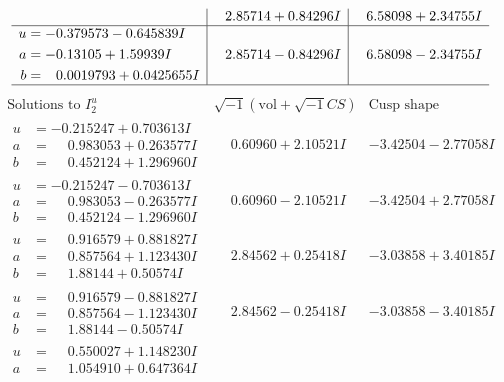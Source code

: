 \documentclass[1p]{elsarticle_modified}
\theoremstyle{definition}
\newcommand{\I}{\sqrt{-1}}
\begin{document}
$$\begin{array}{c|c|c}
 & \phantom{-}2.85714 + 0.84296 I & \phantom{-}6.58098 + 2.34755 I \\ \hline\begin{aligned}
u &= -0.379573 - 0.645839 I \\
a &= -0.13105 + 1.59939 I \\
b &= \phantom{-}0.0019793 + 0.0425655 I\end{aligned}
 & \phantom{-}2.85714 - 0.84296 I & \phantom{-}6.58098 - 2.34755 I\\
 \hline 
 \end{array}$$\newpage$$\begin{array}{c|c|c}  
\text{Solutions to }I^u_{2}& \I (\text{vol} + \sqrt{-1}CS) & \text{Cusp shape}\\
 \hline 
\begin{aligned}
u &= -0.215247 + 0.703613 I \\
a &= \phantom{-}0.983053 + 0.263577 I \\
b &= \phantom{-}0.452124 + 1.296960 I\end{aligned}
 & \phantom{-}0.60960 + 2.10521 I & -3.42504 - 2.77058 I \\ \hline\begin{aligned}
u &= -0.215247 - 0.703613 I \\
a &= \phantom{-}0.983053 - 0.263577 I \\
b &= \phantom{-}0.452124 - 1.296960 I\end{aligned}
 & \phantom{-}0.60960 - 2.10521 I & -3.42504 + 2.77058 I \\ \hline\begin{aligned}
u &= \phantom{-}0.916579 + 0.881827 I \\
a &= \phantom{-}0.857564 + 1.123430 I \\
b &= \phantom{-}1.88144 + 0.50574 I\end{aligned}
 & \phantom{-}2.84562 + 0.25418 I & -3.03858 + 3.40185 I \\ \hline\begin{aligned}
u &= \phantom{-}0.916579 - 0.881827 I \\
a &= \phantom{-}0.857564 - 1.123430 I \\
b &= \phantom{-}1.88144 - 0.50574 I\end{aligned}
 & \phantom{-}2.84562 - 0.25418 I & -3.03858 - 3.40185 I \\ \hline\begin{aligned}
u &= \phantom{-}0.550027 + 1.148230 I \\
a &= \phantom{-}1.054910 + 0.647364 I \\

\end{aligned}
\end{array}$$
\end{document}
